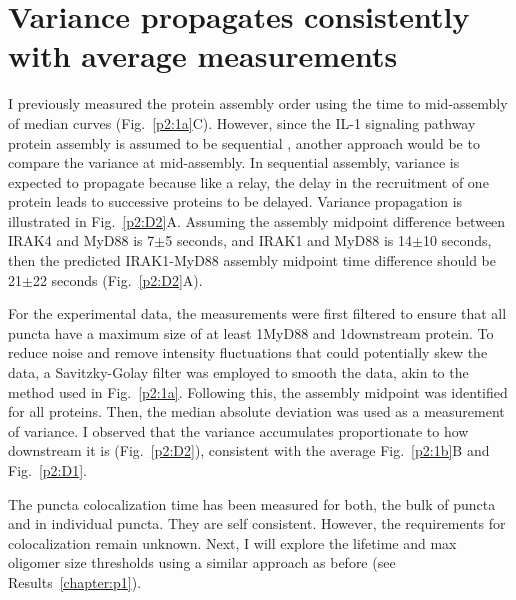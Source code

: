 \section{Variance propagates consistently with average measurements}
\label{section:propagation}
I previously measured the protein assembly order using the time to mid-assembly of median curves (Fig.~\ref{p2:1a}C). However, since the IL-1 signaling pathway protein assembly is assumed to be sequential \autocite{Deliz-Aguirre_2021}, another approach would be to compare the variance at mid-assembly. In sequential assembly, variance is expected to propagate because like a relay, the delay in the recruitment of one protein leads to successive proteins to be delayed. Variance propagation is illustrated in Fig.~\ref{p2:D2}A. Assuming the assembly midpoint difference between IRAK4 and MyD88 is 7$\pm$5 seconds, and IRAK1 and MyD88 is 14$\pm$10 seconds, then the predicted IRAK1-MyD88 assembly midpoint time difference should be 21$\pm$22 seconds (Fig.~\ref{p2:D2}A).

For the experimental data, the measurements were first filtered to ensure that all puncta have a maximum size of at least 1\times MyD88 and 1\times downstream protein. To reduce noise and remove intensity fluctuations that could potentially skew the data, a Savitzky-Golay filter was employed to smooth the data, akin to the method used in Fig.~\ref{p2:1a}. Following this, the assembly midpoint was identified for all proteins. Then, the median absolute deviation was used as a measurement of variance. I observed that the variance accumulates proportionate to how downstream it is (Fig.~\ref{p2:D2}), consistent with the average Fig.~\ref{p2:1b}B and Fig.~\ref{p2:D1}.

The puncta colocalization time has been measured for both, the bulk of puncta and in individual puncta. They are self consistent. However, the requirements for colocalization remain unknown. Next, I will explore the lifetime and max oligomer size thresholds using a similar approach as before (see Results~\ref{chapter:p1}).


